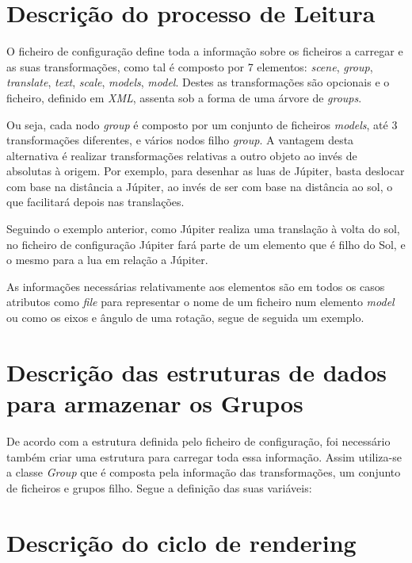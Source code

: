 \chapter{Descrição do processo de Leitura }

O ficheiro de configuração define toda a informação sobre os ficheiros a carregar e as suas transformações, como tal é composto por 7 elementos:
\textit{scene}, \textit{group}, \textit{translate}, \textit{text}, \textit{scale}, \textit{models}, \textit{model}. 
Destes as transformações são opcionais e o ficheiro, definido em \textit{XML}, assenta sob a forma de uma árvore de \textit{groups}.

Ou seja, cada nodo \textit{group} é composto por um conjunto de ficheiros \textit{models}, até 3 transformações diferentes, e vários nodos filho \textit{group}. 
A vantagem desta alternativa é realizar transformações relativas a outro objeto ao invés de absolutas à origem. 
Por exemplo, para desenhar as luas de Júpiter, basta deslocar com base na distância a Júpiter, ao invés de ser com base na distância ao sol, o que facilitará depois nas translações. 

Seguindo o exemplo anterior, como Júpiter realiza uma translação à volta do sol, no ficheiro de configuração Júpiter fará parte de um elemento que é filho do Sol, e o mesmo para a lua em relação a Júpiter.

As informações necessárias relativamente aos elementos são em todos os casos atributos como \textit{file} para representar o nome de um ficheiro num elemento \textit{model} ou como os eixos e ângulo de uma rotação, segue de seguida um exemplo.


\chapter{ Descrição das estruturas de dados para armazenar os Grupos}

De acordo com a estrutura definida pelo ficheiro de configuração, foi necessário também criar uma estrutura para carregar toda essa informação.  Assim utiliza-se a classe \textit{Group }que é composta pela informação das transformações, um conjunto de ficheiros e grupos filho. Segue a definição das
suas variáveis:

\chapter{ Descrição do ciclo de rendering}








